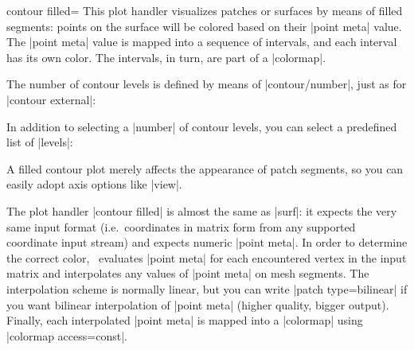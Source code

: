 {{\begin{plottype}[/pgfplots]{contour filled=\textcolor{black}{}}
	This plot handler visualizes patches or surfaces by means of filled segments: points on the surface will be colored based on their |point meta| value. The |point meta| value is mapped into a sequence of intervals, and each interval has its own color. The intervals, in turn, are part of a |colormap|.
\pgfplotsexpensiveexample
\begin{codeexample}[]
\end{codeexample}
	The number of contour levels is defined by means of |contour/number|, just as for |contour external|:

\pgfplotsexpensiveexample
\begin{codeexample}[]
\end{codeexample}

	In addition to selecting a |number| of contour levels, you can select a predefined list of |levels|:
\pgfplotsexpensiveexample
\begin{codeexample}[]
\end{codeexample}
	A filled contour plot merely affects the appearance of patch segments, so you can easily adopt axis options like |view|.

	The plot handler |contour filled| is almost the same as |surf|: it expects the very same input format (i.e.\ coordinates in matrix form from any supported coordinate input stream) and expects numeric |point meta|. In order to determine the correct color, \PGFPlots\ evaluates |point meta| for each encountered vertex in the input matrix and interpolates any values of |point meta| on mesh segments. The interpolation scheme is normally linear, but you can write |patch type=bilinear| if you want bilinear interpolation of |point meta| (higher quality, bigger output). Finally, each interpolated |point meta| is mapped into a |colormap| using |colormap access=const|. 


\end{plottype}}}
